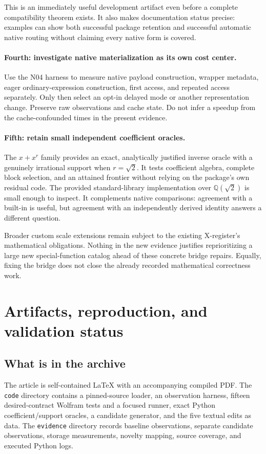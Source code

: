 \documentclass[11pt]{article}
\newcommand{\code}[1]{\texttt{#1}}
\newcommand{\q}{\sqrt{2}}
\begin{document}
This is an immediately useful development artifact even before a complete compatibility theorem exists. It also makes documentation status precise: examples can show both successful package retention and successful automatic native routing without claiming every native form is covered.

\paragraph{Fourth: investigate native materialization as its own cost center.}
Use the N04 harness to measure native payload construction, wrapper metadata, eager ordinary-expression construction, first access, and repeated access separately. Only then select an opt-in delayed mode or another representation change. Preserve raw observations and cache state. Do not infer a speedup from the cache-confounded times in the present evidence.

\paragraph{Fifth: retain small independent coefficient oracles.}
The $x+x^r$ family provides an exact, analytically justified inverse oracle with a genuinely irrational support when $r=\q$. It tests coefficient algebra, complete block selection, and an attained frontier without relying on the package's own residual code. The provided standard-library implementation over $\mathbb Q(\q)$ is small enough to inspect. It complements native comparisons: agreement with a built-in is useful, but agreement with an independently derived identity answers a different question.

Broader custom scale extensions remain subject to the existing X-register's mathematical obligations. Nothing in the new evidence justifies reprioritizing a large new special-function catalog ahead of these concrete bridge repairs. Equally, fixing the bridge does not close the already recorded mathematical correctness work.\cite{register}

\section{Artifacts, reproduction, and validation status}
\label{sec:artifacts}
\subsection{What is in the archive}
The article is self-contained LaTeX with an accompanying compiled PDF. The \code{code} directory contains a pinned-source loader, an observation harness, fifteen desired-contract Wolfram tests and a focused runner, exact Python coefficient/support oracles, a candidate generator, and the five textual edits as data. The \code{evidence} directory records baseline observations, separate candidate observations, storage measurements, novelty mapping, source coverage, and executed Python logs.
\end{document}

